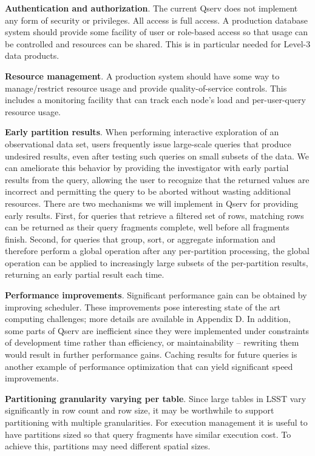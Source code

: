 \documentclass[DM,lsstdraft,toc]{lsstdoc}
\begin{document}
\textbf{Authentication and authorization}. The current Qserv does not
implement any form of security or privileges. All access is full access.
A production database system should provide some facility of user or
role-based access so that usage can be controlled and resources can be
shared. This is in particular needed for Level-3 data products.

\textbf{Resource management}. A production system should have some way
to manage/restrict resource usage and provide quality-of-service
controls. This includes a monitoring facility that can track each node's
load and per-user-query resource usage.

\textbf{Early partition results}. When performing interactive
exploration of an observational data set, users frequently issue
large-scale queries that produce undesired results, even after testing
such queries on small subsets of the data. We can ameliorate this
behavior by providing the investigator with early partial results from
the query, allowing the user to recognize that the returned values are
incorrect and permitting the query to be aborted without wasting
additional resources. There are two mechanisms we will implement in
Qserv for providing early results. First, for queries that retrieve a
filtered set of rows, matching rows can be returned as their query
fragments complete, well before all fragments finish. Second, for
queries that group, sort, or aggregate information and therefore perform
a global operation after any per-partition processing, the global
operation can be applied to increasingly large subsets of the
per-partition results, returning an early partial result each time.

\textbf{Performance improvements}. Significant performance gain can be
obtained by improving scheduler. These improvements pose interesting
state of the art computing challenges; more details are available in
Appendix D. In addition, some parts of Qserv are inefficient since they
were implemented under constraints of development time rather than
efficiency, or maintainability -- rewriting them would result in further
performance gains. Caching results for future queries is another example
of performance optimization that can yield significant speed
improvements.

\textbf{Partitioning granularity varying per table}. Since large tables
in LSST vary significantly in row count and row size, it may be
worthwhile to support partitioning with multiple granularities. For
execution management it is useful to have partitions sized so that query
fragments have similar execution cost. To achieve this, partitions may
need different spatial sizes.
\end{document}
